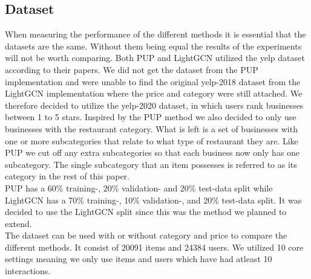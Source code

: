 \subsection{Dataset} \label{equal-data}
When measuring the performance of the different methods it is essential that the datasets are the same.
Without them being equal the results of the experiments will not be worth comparing.
Both PUP and LightGCN utilized the yelp dataset according to their papers.
We did not get the dataset from the PUP implementation and were unable to find the original yelp-2018 dataset from the LightGCN implementation where the price and category were still attached.
We therefore decided to utilize the yelp-2020 dataset, in which users rank businesses between 1 to 5 stars.
Inspired by the PUP method we also decided to only use businesses with the restaurant category.
What is left is a set of businesses with one or more subcategories that relate to what type of restaurant they are.
Like PUP we cut off any extra subcategories so that each business now only has one subcategory.
The single subcategory that an item possesses is referred to as its category in the rest of this paper.
\\
PUP has a 60\% training-, 20\% validation- and 20\% test-data split while LightGCN has a 70\% training-, 10\% validation-, and 20\% test-data split.
It was decided to use the LightGCN split since this was the method we planned to extend.
\\
The dataset can be used with or without category and price to compare the different methods.
It consist of 20091 items and 24384 users.
We utilized 10 core settings meaning we only use items and users which have had atleast 10 interactions.

